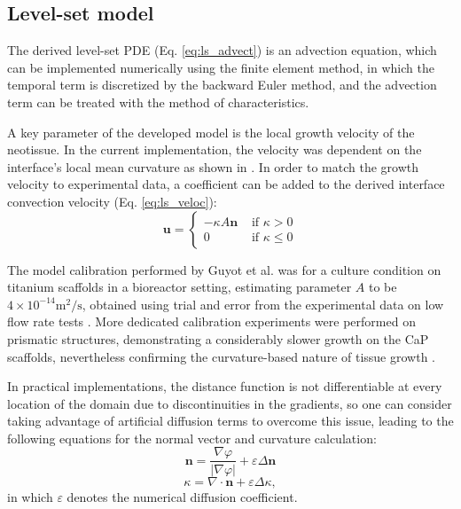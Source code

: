\subsection{Level-set model}

The derived level-set {PDE} (Eq. \ref{eq:ls_advect}) is an advection equation, which can be implemented numerically using the finite element method, in which the temporal term is discretized by the backward Euler method, and the advection term can be treated with the method of characteristics.

A key parameter of the developed model is the local growth velocity of the neotissue. In the current implementation, the velocity was dependent on the interface's local mean curvature as shown in \cite{Bidan2012a,Guyot2014}. In order to match the growth velocity to experimental data, a coefficient can be added to the derived interface convection velocity (Eq. \ref{eq:ls_veloc}):
\begin{equation} \label{eq:ls_veloc2}
\boldsymbol{u}=\left\{\begin{array}{ll}
-\kappa A \boldsymbol{n} & \text { if } \kappa>0 \\
0 & \text { if } \kappa \leq 0
\end{array}\right.
\end{equation}

The model calibration performed by Guyot et al. \cite{Guyot2014} was for a culture condition on titanium scaffolds in a bioreactor setting, estimating parameter $A$ to be $4\times10^{-14} \text{m}^2/\text{s}$, obtained using trial and error from the experimental data on low flow rate tests \cite{Papantoniou2014}.
More dedicated calibration experiments were performed on prismatic structures, demonstrating a considerably slower growth on the CaP scaffolds, nevertheless confirming the curvature-based nature of tissue growth \cite{Hede2021}.

In practical implementations, the distance function is not differentiable at every location of the domain due to discontinuities in the gradients, so one can consider taking advantage of artificial diffusion terms to overcome this issue, leading to the following equations for the normal vector and curvature calculation:
\begin{equation}
\boldsymbol{n}=\frac{\nabla \varphi}{|\nabla \varphi|}+\varepsilon \Delta \boldsymbol{n}
\end{equation}
\begin{equation}
\kappa=\nabla \cdot \boldsymbol{n}+\varepsilon \Delta \kappa,
\end{equation}
in which $\varepsilon$ denotes the numerical diffusion coefficient.


